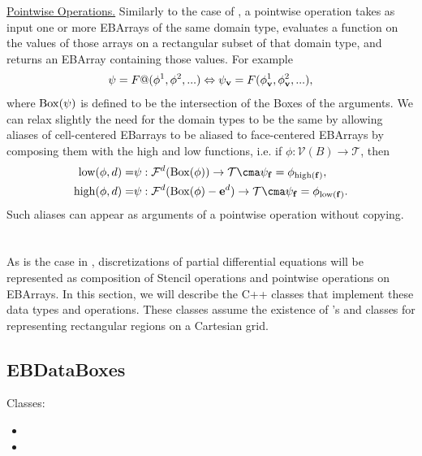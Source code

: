 \documentclass[12pt]{article}
\newcommand{\mcl}[1]{{\mathcal{#1}}}
\newcommand{\low}{{\rm{low}}}
\newcommand{\high}{{\rm{high}}}
\newcommand{\MBox}{{\rm{Box}}}
\newcommand{\vof}{{\mbf{v}}}
\newcommand{\face}{{\mbf{f}}}
\begin{document}
\noindent
\underline{Pointwise Operations.} Similarly to the case of , a pointwise operation takes as input one or more EBArrays of the same domain type, evaluates a function on the values of those arrays on a rectangular subset of that domain type, and returns an EBArray containing those values. For example
\begin{gather*}
\psi = F@(\phi^{1},\phi^2, ...) \Leftrightarrow \psi_{\vof} = F(\phi_\vof^1,\phi_\vof^2, ...),
\end{gather*}
where $\MBox(\psi)$ is defined to be the intersection of the Boxes of the arguments.
We can relax slightly the need for the domain types to be the same by allowing aliases of cell-centered EBarrays to be aliased to face-centered EBArrays by composing them with the high and low functions, i.e. if $\phi:\mcl{V}(B) \rightarrow \mcl{T}$, then
\begin{align*}
\low(\phi,d) = & \psi:\mcl{F}^d(\MBox(\phi)) \rightarrow \mcl{T} \cma \psi_\face = \phi_{\high(\face)}, \\ 
\high(\phi,d) = & \psi:\mcl{F}^d(\MBox(\phi)- \mbf{e}^d) \rightarrow \mcl{T} \cma \psi_\face = \phi_{\low(\face)}.
\end{align*}
Such aliases can appear as arguments of a pointwise operation without copying.
\section{} 

As is the case in , discretizations of partial differential equations will be represented as composition of Stencil operations and pointwise operations on EBArrays. In this section, we will describe the C++ classes that implement these data types and operations. These classes assume the existence of 's  and  classes for representing rectangular regions on a Cartesian grid.

\subsection{}

\subsection{EBDataBoxes}
Classes:
\begin{itemize}
\item
{}
\item
{}
\end{itemize}
\end{document}

